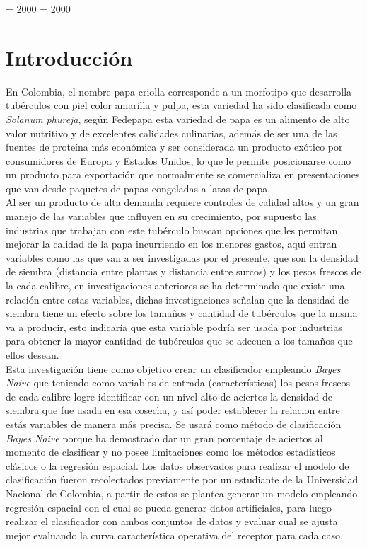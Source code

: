 
\righthyphenmin = 2000
\lefthyphenmin = 2000

\chapter*{Introducci\'on}

En Colombia, el nombre papa criolla corresponde a un morfotipo que desarrolla tubérculos con piel color amarilla y pulpa, esta variedad ha sido clasificada como \textit{Solanum phureja}, según Fedepapa esta variedad de papa es un alimento de alto valor nutritivo y de excelentes calidades culinarias, además de ser una de las fuentes de proteína más económica y ser considerada un producto exótico por consumidores de Europa y Estados Unidos, lo que le permite posicionarse como un producto para exportación que normalmente se comercializa en presentaciones que van desde paquetes de papas congeladas a latas de papa.\\

Al ser un producto de alta demanda requiere controles de calidad altos y un gran manejo de las variables que influyen en su crecimiento, por supuesto las industrias que trabajan con este tubérculo buscan opciones que les permitan mejorar la calidad de la papa incurriendo en los menores gastos, aquí entran variables como las que van a ser investigadas por el presente, que son la densidad de siembra (distancia entre plantas y distancia entre surcos) y los pesos frescos de la cada calibre, en investigaciones anteriores se ha determinado que existe una relación entre estas variables, dichas investigaciones señalan que la densidad de siembra tiene un efecto sobre los tamaños y cantidad de tubérculos que la misma va a producir, esto indicaría que esta variable podría ser usada por industrias para obtener la mayor cantidad de tubérculos que se adecuen a los tamaños que ellos desean. \\

Esta investigación tiene como objetivo crear un clasificador empleando \textit{Bayes Naive} que teniendo como variables de entrada (características) los pesos frescos de cada calibre logre identificar con un nivel alto de aciertos la densidad de siembra que fue usada en esa cosecha, y así poder establecer la relacion entre estás variables de manera más precisa. Se usará como método de clasificación \textit{Bayes Naive} porque ha demostrado dar un gran porcentaje de aciertos al momento de clasificar y no posee limitaciones como los métodos estadísticos clásicos o la regresión espacial. Los datos observados para realizar el modelo de clasificación fueron recolectados previamente por un estudiante de la Universidad Nacional de Colombia, a partir de estos se plantea generar un modelo empleando regresión espacial con el cual se pueda generar datos artificiales, para luego realizar el clasificador con ambos conjuntos de datos y evaluar cual se ajusta mejor evaluando la curva característica operativa del receptor para cada caso.\\ 


